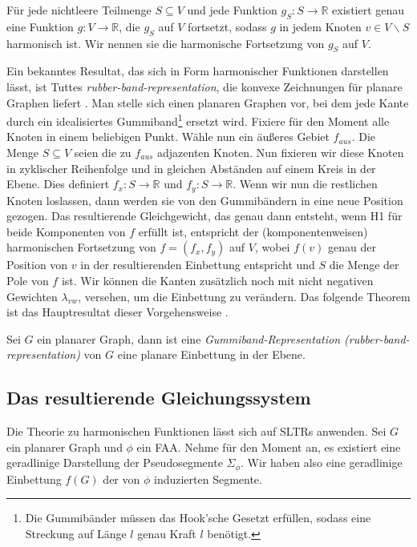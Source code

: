 \begin{theorem}\cite[Theorem 3.1.2]{lov99}\label{harmonic_uni}
Für jede nichtleere Teilmenge $S \subseteq V$ und jede Funktion $g_S:S\to\mathbb{R}$ existiert genau eine Funktion $g:V\to\mathbb{R}$, die $g_S$ auf $V$ fortsetzt, sodass $g$ in jedem Knoten $v\in V \backslash S$ harmonisch ist. Wir nennen sie die harmonische Fortsetzung von $g_S$ auf $V$.
\end{theorem}

Ein bekanntes Resultat, das sich in Form harmonischer Funktionen darstellen lässt, ist Tuttes \textit{rubber-band-representation}, die konvexe Zeichnungen für planare Graphen liefert \cite{tutte63}. Man stelle sich einen planaren Graphen vor, bei dem jede Kante durch ein idealisiertes Gummiband\footnote{Die Gummibänder müssen das Hook'sche Gesetzt erfüllen, sodass eine Streckung auf Länge $l$ genau Kraft $l$ benötigt.} ersetzt wird. Fixiere für den Moment alle Knoten in einem beliebigen Punkt. Wähle nun ein äußeres Gebiet $f_{aus}$. Die Menge $S\subseteq V$ seien die zu $f_{aus}$ adjazenten Knoten. Nun fixieren wir diese Knoten in zyklischer Reihenfolge und in gleichen Abständen auf einem Kreis in der Ebene. Dies definiert $f_x:S \to \mathbb{R}$ und  $f_y:S \to \mathbb{R}$. Wenn wir nun die restlichen Knoten loslassen, dann werden sie von den Gummibändern in eine neue Position gezogen. Das resultierende Gleichgewicht, das genau dann entsteht, wenn H1 für beide Komponenten von $f$ erfüllt ist, entspricht der (komponentenweisen) harmonischen Fortsetzung von $f=(f_x,f_y)$  auf $V$, wobei $f(v)$ genau der Position von $v$ in der resultierenden Einbettung entspricht und $S$ die Menge der Pole von $f$ ist. Wir können die Kanten zusätzlich noch mit nicht negativen Gewichten $\lambda_{vw}$, versehen, um die Einbettung zu verändern. Das folgende Theorem ist das Hauptresultat dieser Vorgehensweise \cite{tutte63}.

\begin{theorem}\label{theo_rubber}
Sei $G$ ein planarer Graph, dann ist eine \textit{Gummiband-Representation (rubber-band-representation)} von $G$ eine planare Einbettung in der Ebene.
\end{theorem}

\subsection{Das resultierende Gleichungssystem}\label{the_equations}

Die Theorie zu harmonischen Funktionen lässt sich auf SLTRs anwenden. Sei $G$ ein planarer Graph und $\phi$ ein FAA. Nehme für den Moment an, es existiert eine geradlinige Darstellung der Pseudosegmente $\Sigma_{\phi}$. Wir haben also eine geradlinige Einbettung $f(G)$ der von $\phi$ induzierten Segmente. 

